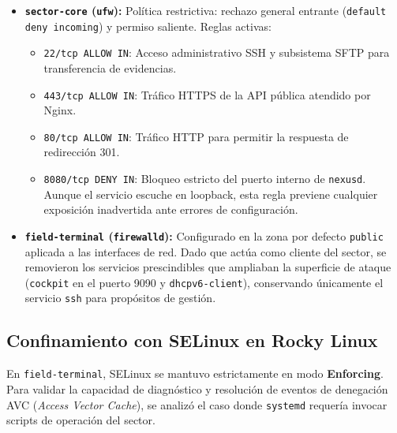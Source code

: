 \documentclass[10pt,a4paper]{article}
\begin{document}
\begin{itemize}[leftmargin=*]
    \item \textbf{\texttt{sector-core} (\texttt{ufw}):} Política restrictiva: rechazo general entrante (\texttt{default deny incoming}) y permiso saliente. Reglas activas:
    \begin{itemize}
        \item \texttt{22/tcp ALLOW IN}: Acceso administrativo SSH y subsistema SFTP para transferencia de evidencias.
        \item \texttt{443/tcp ALLOW IN}: Tráfico HTTPS de la API pública atendido por Nginx.
        \item \texttt{80/tcp ALLOW IN}: Tráfico HTTP para permitir la respuesta de redirección 301.
        \item \texttt{8080/tcp DENY IN}: Bloqueo estricto del puerto interno de \texttt{nexusd}. Aunque el servicio escuche en loopback, esta regla previene cualquier exposición inadvertida ante errores de configuración.
    \end{itemize}
    \item \textbf{\texttt{field-terminal} (\texttt{firewalld}):} Configurado en la zona por defecto \texttt{public} aplicada a las interfaces de red. Dado que actúa como cliente del sector, se removieron los servicios prescindibles que ampliaban la superficie de ataque (\texttt{cockpit} en el puerto 9090 y \texttt{dhcpv6-client}), conservando únicamente el servicio \texttt{ssh} para propósitos de gestión.
\end{itemize}

\subsection{Confinamiento con SELinux en Rocky Linux}

En \texttt{field-terminal}, SELinux se mantuvo estrictamente en modo \textbf{Enforcing}. Para validar la capacidad de diagnóstico y resolución de eventos de denegación AVC (\textit{Access Vector Cache}), se analizó el caso donde \texttt{systemd} requería invocar scripts de operación del sector.
\end{document}
